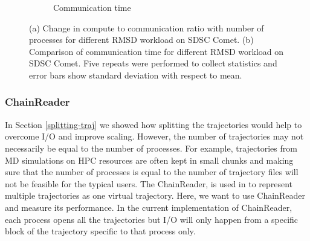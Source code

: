 \begin{figure}[ht!]
\begin{subfigure}{.4\textwidth}
  \caption{Communication time}
  \label{fig:MPItottime-chain-reader}
\end{subfigure}
\caption{(a) Change in compute to communication ratio with number of processes for different RMSD workload on SDSC Comet. 
(b) Comparison of communication time for different RMSD workload on SDSC Comet.
Five repeats were performed to collect statistics and error bars show standard deviation with respect to mean.}
\label{fig:tcom_tcomm_effect}
\end{figure}

\subsubsection{ChainReader}
In Section \ref{splitting-traj} we showed how splitting the trajectories would help to overcome I/O and improve scaling. 
However, the number of trajectories may not necessarily be equal to the number of processes.
For example, trajectories from MD simulations on HPC resources are often kept in small chunks and making sure that the number of processes is equal to the number of trajectory files will not be feasible for the typical users. 
The ChainReader, is used in  to represent multiple trajectories as one virtual trajectory. 
Here, we want to use ChainReader and measure its performance. 
In the current implementation of ChainReader, each process opens all the trajectories but I/O will only happen from a specific block of the trajectory specific to that process only.
 
